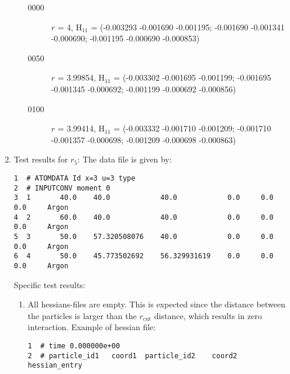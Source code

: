 \documentclass[a4paper]{article}
\begin{document}
\begin{enumerate}
\begin{enumerate}
\begin{description}
\item[{0000}] \(r\) = 4, H$_{\text{11}}$ = (-0.003293 -0.001690 -0.001195; -0.001690 -0.001341 -0.000690; -0.001195 -0.000690 -0.000853)
\item[{0050}] \(r\) = 3.99854, H$_{\text{11}}$ = (-0.003302 -0.001695 -0.001199; -0.001695 -0.001345 -0.000692; -0.001199 -0.000692 -0.000856)
\item[{0100}] \(r\) = 3.99414, H$_{\text{11}}$ = (-0.003332 -0.001710 -0.001209; -0.001710 -0.001357 -0.000698; -0.001209 -0.000698 -0.000863)
\end{description}
\end{enumerate}
\item Test results for \(r_5\):
\label{sec-1-6-1-8}
The data file is given by:
\begin{verbatim}
1  # ATOMDATA Id x=3 u=3 type
2  # INPUTCONV moment 0
3  1       40.0    40.0            40.0            0.0     0.0     0.0     Argon
4  2       60.0    40.0            40.0            0.0     0.0     0.0     Argon
5  3       50.0    57.320508076    40.0            0.0     0.0     0.0     Argon
6  4       50.0    45.773502692    56.329931619    0.0     0.0     0.0     Argon
\end{verbatim}
Specific test results:
\begin{enumerate}
\item All hessians-files are empty. This is expected since the distance between the particles is larger than the \(r_{\textrm{cut}}\) distance, which results in zero interaction.
Example of hessian file:
\begin{verbatim}
1  # time 0.000000e+00
2  # particle_id1   coord1  particle_id2    coord2  hessian_entry
\end{verbatim}
\end{enumerate}
\end{enumerate}
\end{document}
